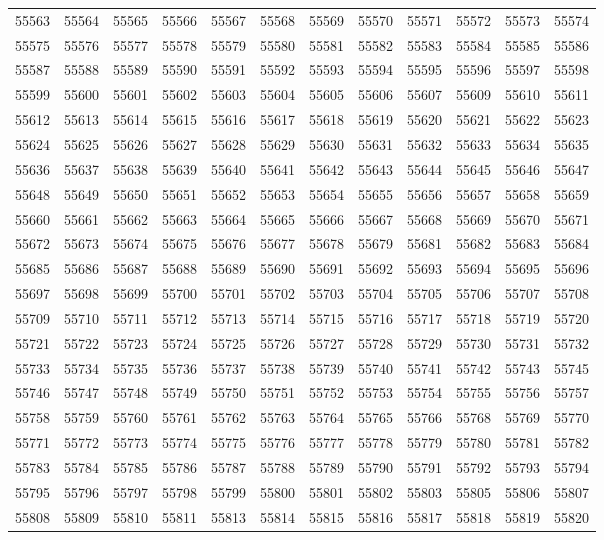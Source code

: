 \begin{center}
\begin{longtable}{llllllllllll}
55563 &55564 &55565 &55566 &55567 &55568 &55569 &55570 &55571 &55572 &55573 &55574 \\
55575 &55576 &55577 &55578 &55579 &55580 &55581 &55582 &55583 &55584 &55585 &55586 \\
55587 &55588 &55589 &55590 &55591 &55592 &55593 &55594 &55595 &55596 &55597 &55598 \\
55599 &55600 &55601 &55602 &55603 &55604 &55605 &55606 &55607 &55609 &55610 &55611 \\
55612 &55613 &55614 &55615 &55616 &55617 &55618 &55619 &55620 &55621 &55622 &55623 \\
55624 &55625 &55626 &55627 &55628 &55629 &55630 &55631 &55632 &55633 &55634 &55635 \\
55636 &55637 &55638 &55639 &55640 &55641 &55642 &55643 &55644 &55645 &55646 &55647 \\
55648 &55649 &55650 &55651 &55652 &55653 &55654 &55655 &55656 &55657 &55658 &55659 \\
55660 &55661 &55662 &55663 &55664 &55665 &55666 &55667 &55668 &55669 &55670 &55671 \\
55672 &55673 &55674 &55675 &55676 &55677 &55678 &55679 &55681 &55682 &55683 &55684 \\
55685 &55686 &55687 &55688 &55689 &55690 &55691 &55692 &55693 &55694 &55695 &55696 \\
55697 &55698 &55699 &55700 &55701 &55702 &55703 &55704 &55705 &55706 &55707 &55708 \\
55709 &55710 &55711 &55712 &55713 &55714 &55715 &55716 &55717 &55718 &55719 &55720 \\
55721 &55722 &55723 &55724 &55725 &55726 &55727 &55728 &55729 &55730 &55731 &55732 \\
55733 &55734 &55735 &55736 &55737 &55738 &55739 &55740 &55741 &55742 &55743 &55745 \\
55746 &55747 &55748 &55749 &55750 &55751 &55752 &55753 &55754 &55755 &55756 &55757 \\
55758 &55759 &55760 &55761 &55762 &55763 &55764 &55765 &55766 &55768 &55769 &55770 \\
55771 &55772 &55773 &55774 &55775 &55776 &55777 &55778 &55779 &55780 &55781 &55782 \\
55783 &55784 &55785 &55786 &55787 &55788 &55789 &55790 &55791 &55792 &55793 &55794 \\
55795 &55796 &55797 &55798 &55799 &55800 &55801 &55802 &55803 &55805 &55806 &55807 \\
55808 &55809 &55810 &55811 &55813 &55814 &55815 &55816 &55817 &55818 &55819 &55820 \\

\end{longtable}
\end{center}
